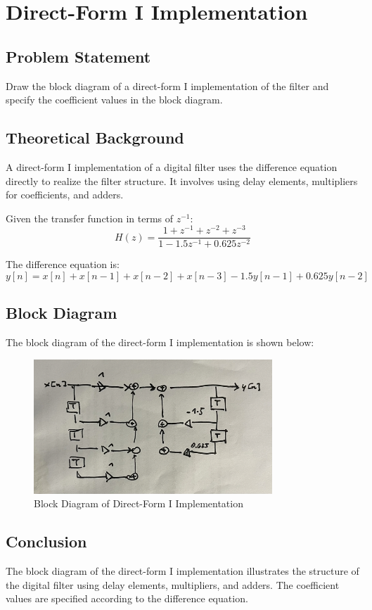 \item[(d)]
\section{Direct-Form I Implementation}

\subsection*{Problem Statement}
Draw the block diagram of a direct-form I implementation of the filter and specify the coefficient values in the block diagram.

\subsection*{Theoretical Background}
A direct-form I implementation of a digital filter uses the difference equation directly to realize the filter structure. It involves using delay elements, multipliers for coefficients, and adders.

Given the transfer function in terms of \( z^{-1} \):
\[ H(z) = \frac{1 + z^{-1} + z^{-2} + z^{-3}}{1 - 1.5z^{-1} + 0.625z^{-2}} \]

The difference equation is:
\[ y[n] = x[n] + x[n-1] + x[n-2] + x[n-3] - 1.5y[n-1] + 0.625y[n-2] \]

\subsection*{Block Diagram}
The block diagram of the direct-form I implementation is shown below:

\begin{figure}[h]
    \centering
    \includegraphics[width=0.8\textwidth]{fig/ex3_d_block_diagram.png}
    \caption{Block Diagram of Direct-Form I Implementation}
    \label{fig:ex3_d_block_diagram}
\end{figure}

\subsection*{Conclusion}
The block diagram of the direct-form I implementation illustrates the structure of the digital filter using delay elements, multipliers, and adders. The coefficient values are specified according to the difference equation.
